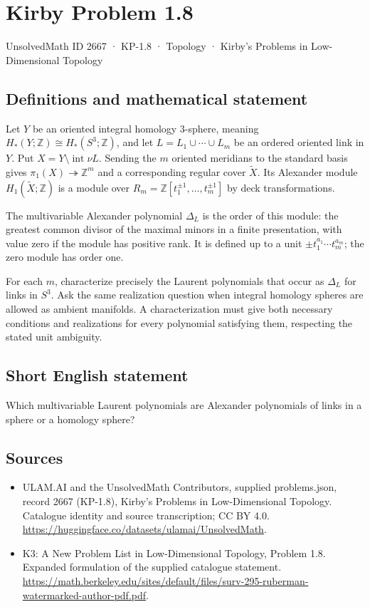 \documentclass[11pt,a4paper]{article}
\begin{document}
\section*{Kirby Problem 1.8}\label{2667}
{\small UnsolvedMath ID 2667 · KP-1.8 · Topology · Kirby's Problems in Low-Dimensional Topology}
\subsection{Definitions and mathematical statement}
Let $Y$ be an oriented integral homology $3$-sphere, meaning
$H_*(Y;\mathbb Z)\cong H_*(S^3;\mathbb Z)$, and let
$L=L_1\cup\cdots\cup L_m$ be an ordered oriented link in $Y$.
Put $X=Y\setminus\operatorname{int}\nu L$.
Sending the $m$ oriented meridians to the standard basis gives
$\pi_1(X)\twoheadrightarrow\mathbb Z^m$ and a corresponding regular cover
$\widetilde X$. Its Alexander module $H_1(\widetilde X;\mathbb Z)$ is a module over
$R_m=\mathbb Z[t_1^{\pm1},\ldots,t_m^{\pm1}]$ by deck transformations.

The multivariable Alexander polynomial $\Delta_L$ is the order of this module:
the greatest common divisor of the maximal minors in a finite presentation,
with value zero if the module has positive rank. It is defined up to a unit
$\pm t_1^{a_1}\cdots t_m^{a_m}$; the zero module has order one.

For each $m$, characterize precisely the Laurent polynomials that occur as
$\Delta_L$ for links in $S^3$. Ask the same realization question when integral
homology spheres are allowed as ambient manifolds. A characterization must give
both necessary conditions and realizations for every polynomial satisfying them,
respecting the stated unit ambiguity.
\subsection{Short English statement}
Which multivariable Laurent polynomials are Alexander polynomials of links in a sphere or a homology sphere?
\subsection{Sources}
\begin{itemize}
\item[S1] ULAM.AI and the UnsolvedMath Contributors, supplied problems.json, record 2667 (KP-1.8), Kirby's Problems in Low-Dimensional Topology. Catalogue identity and source transcription; CC BY 4.0.
\url{https://huggingface.co/datasets/ulamai/UnsolvedMath}.
\item[S2] K3: A New Problem List in Low-Dimensional Topology, Problem 1.8. Expanded formulation of the supplied catalogue statement.
\url{https://math.berkeley.edu/sites/default/files/surv-295-ruberman-watermarked-author-pdf.pdf}.
\end{itemize}
\end{document}
